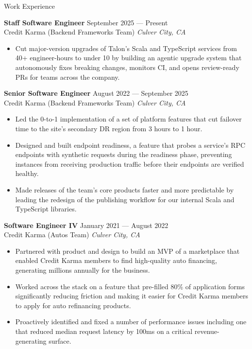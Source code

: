 \documentclass{resume} %
\begin{document}
\begin{rSection}{Work Experience}

\textbf{Staff Software Engineer} \hfill September 2025 --- Present \\
Credit Karma (Backend Frameworks Team) \hfill \textit{Culver City, CA}
\begin{itemize}
    \item Cut major-version upgrades of Talon's Scala and TypeScript services from 40+ engineer-hours to under 10 by building an agentic upgrade system that autonomously fixes breaking changes, monitors CI, and opens review-ready PRs for teams across the company.
\end{itemize}

\textbf{Senior Software Engineer} \hfill August 2022 --- September 2025 \\
Credit Karma (Backend Frameworks Team) \hfill \textit{Culver City, CA}
\begin{itemize}
    \item Led the 0-to-1 implementation of a set of platform features that cut failover time to the site's secondary DR region from 3 hours to 1 hour.
    \item Designed and built endpoint readiness, a feature that probes a service's RPC endpoints with synthetic requests during the readiness phase, preventing instances from receiving production traffic before their endpoints are verified healthy.
    \item Made releases of the team's core products faster and more predictable by leading the redesign of the publishing workflow for our internal Scala and TypeScript libraries.
\end{itemize}

\textbf{Software Engineer IV} \hfill January 2021 --- August 2022 \\
Credit Karma (Autos Team) \hfill \textit{Culver City, CA}
\begin{itemize}
    \item Partnered with product and design to build an MVP of a marketplace that enabled Credit Karma members to find high-quality auto financing, generating millions annually for the business.
    \item Worked across the stack on a feature that pre-filled 80\% of application forms significantly reducing friction and making it easier for Credit Karma members to apply for auto refinancing products.
    \item Proactively identified and fixed a number of performance issues including one that reduced median request latency by 100ms on a critical revenue-generating surface.
\end{itemize}
    

\end{rSection}
\end{document}
